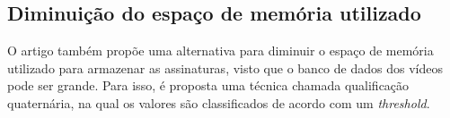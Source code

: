 \subsection{Diminuição do espaço de memória utilizado}

O artigo também propõe uma alternativa para diminuir o espaço de memória utilizado para armazenar as assinaturas, visto que o banco de dados dos vídeos pode ser grande. Para isso, é proposta uma técnica chamada qualificação quaternária, na qual os valores são classificados de acordo com um \textit{threshold}.



